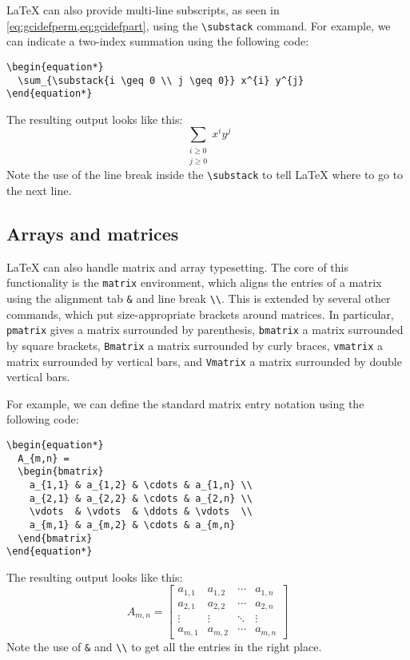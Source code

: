 \documentclass{article}
\newcommand*{\code}[1]{\texttt{#1}}
\begin{document}
\LaTeX{} can also provide multi-line subscripts, as seen in \cref{eq:gcidefperm,eq:gcidefpart}, using the \code{\textbackslash{}substack} command.
For example, we can indicate a two-index summation using the following code:
\begin{verbatim}
\begin{equation*}
  \sum_{\substack{i \geq 0 \\ j \geq 0}} x^{i} y^{j}
\end{equation*}
\end{verbatim}
The resulting output looks like this:
\begin{equation*}
  \sum_{\substack{i \geq 0 \\ j \geq 0}} x^{i} y^{j}
\end{equation*}
Note the use of the line break inside the \code{\textbackslash{}substack} to tell \LaTeX{} where to go to the next line.

\subsection{Arrays and matrices}
\LaTeX{} can also handle matrix and array typesetting.
The core of this functionality is the \code{matrix} environment, which aligns the entries of a matrix using the alignment tab \code{\&} and line break \code{\textbackslash{}\textbackslash{}}.
This is extended by several other commands, which put size-appropriate brackets around matrices.
In particular, \code{pmatrix} gives a matrix surrounded by parenthesis, \code{bmatrix} a matrix surrounded by square brackets, \code{Bmatrix} a matrix surrounded by curly braces, \code{vmatrix} a matrix surrounded by vertical bars, and \code{Vmatrix} a matrix surrounded by double vertical bars.

For example, we can define the standard matrix entry notation using the following code:
\begin{verbatim}
\begin{equation*}
  A_{m,n} =
  \begin{bmatrix}
    a_{1,1} & a_{1,2} & \cdots & a_{1,n} \\
    a_{2,1} & a_{2,2} & \cdots & a_{2,n} \\
    \vdots  & \vdots  & \ddots & \vdots  \\
    a_{m,1} & a_{m,2} & \cdots & a_{m,n}
  \end{bmatrix}
\end{equation*}
\end{verbatim}
The resulting output looks like this:
\begin{equation*}
  A_{m,n} =
  \begin{bmatrix}
    a_{1,1} & a_{1,2} & \cdots & a_{1,n} \\
    a_{2,1} & a_{2,2} & \cdots & a_{2,n} \\
    \vdots  & \vdots  & \ddots & \vdots  \\
    a_{m,1} & a_{m,2} & \cdots & a_{m,n}
  \end{bmatrix}
\end{equation*}
Note the use of \code{\&} and \code{\textbackslash{}\textbackslash{}} to get all the entries in the right place.
\end{document}
